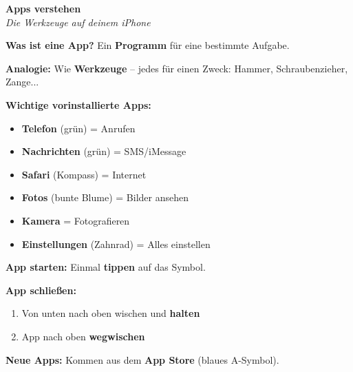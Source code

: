 \documentclass[a4paper,landscape,8pt]{extarticle}
\begin{document}
\hfill%
\begin{minipage}[t]{0.32\linewidth}
\begin{center}
\colorbox{appgreen!10}{%
\begin{minipage}{0.95\linewidth}
\vspace{2mm}
\begin{center}
{\Large\bfseries\textcolor{appgreen}{Apps verstehen}}\\[1pt]
{\footnotesize\itshape Die Werkzeuge auf deinem iPhone}
\end{center}
\vspace{2mm}
\end{minipage}%
}
\end{center}

\vspace{1mm}

\textbf{Was ist eine App?} Ein \textbf{Programm} für eine bestimmte Aufgabe.

\textbf{Analogie:} Wie \textbf{Werkzeuge} -- jedes für einen Zweck: Hammer, Schraubenzieher, Zange...

\textbf{Wichtige vorinstallierte Apps:}
\begin{itemize}
\item \textbf{Telefon} (grün) = Anrufen
\item \textbf{Nachrichten} (grün) = SMS/iMessage
\item \textbf{Safari} (Kompass) = Internet
\item \textbf{Fotos} (bunte Blume) = Bilder ansehen
\item \textbf{Kamera} = Fotografieren
\item \textbf{Einstellungen} (Zahnrad) = Alles einstellen
\end{itemize}

\textbf{App starten:} Einmal \textbf{tippen} auf das Symbol.

\textbf{App schließen:}
\begin{enumerate}
\item Von unten nach oben wischen und \textbf{halten}
\item App nach oben \textbf{wegwischen}
\end{enumerate}

\textbf{Neue Apps:} Kommen aus dem \textbf{App Store} (blaues A-Symbol).

\end{minipage}%
\hfill%
\end{document}
